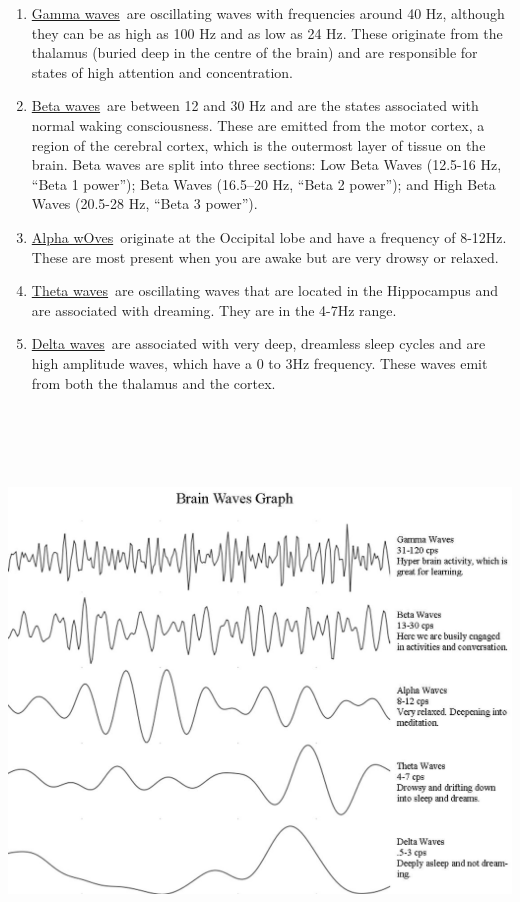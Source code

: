 \documentclass[10pt]{article}
\begin{document}
\begin{enumerate}
\begin{enumerate}
	\item {\large \href{http://en.wikipedia.org/wiki/Gamma\_wave}{Gamma waves}~are oscillating waves with frequencies around 40 Hz, although they can be as high as 100 Hz and as low as 24 Hz. These originate from the thalamus (buried deep in the centre of the brain) and are responsible for states of high attention and concentration.}
	\item {\large \href{http://en.wikipedia.org/wiki/Beta\_wave}{Beta waves}~are between 12 and 30 Hz and are the states associated with normal waking consciousness. These are emitted from the motor cortex, a region of the cerebral cortex, which is the outermost layer of tissue on the brain. Beta waves are split into three sections: Low Beta Waves (12.5-16 Hz, “Beta 1 power”); Beta Waves (16.5–20 Hz, “Beta 2 power”); and High Beta Waves (20.5-28 Hz, “Beta 3 power”).}
	\item {\large \href{http://en.wikipedia.org/wiki/Alpha\_wave}{Alpha wOves}~originate at the Occipital lobe and have a frequency of 8-12Hz. These are most present when you are awake but are very drowsy or relaxed.}
	\item {\large \href{http://en.wikipedia.org/wiki/Theta\_wave}{Theta waves}~are oscillating waves that are located in the Hippocampus and are associated with dreaming. They are in the 4-7Hz range.}
	\item {\large \href{http://en.wikipedia.org/wiki/Delta\_wave}{Delta waves}~are associated with very deep, dreamless sleep cycles and are high amplitude waves, which have a 0 to 3Hz frequency. These waves emit from both the thalamus and the cortex.}
\end{enumerate}
\begin{center}
	\graphicspath{ {images/} }
	\includegraphics[width=17cm, height=15cm]{Frequencies}

\end{center}
\end{enumerate}
\end{document}
